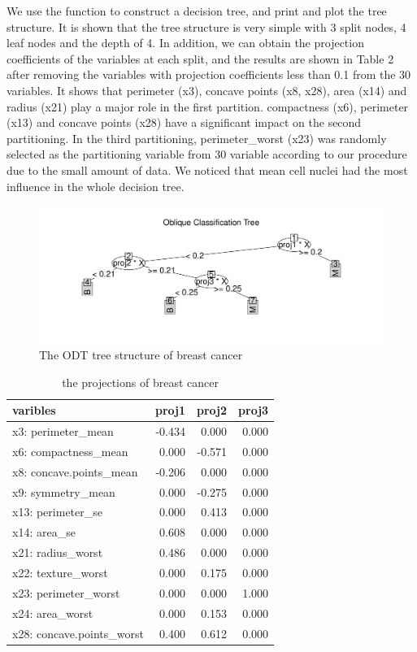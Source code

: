 \documentclass[nojss]{jss}
\newcommand{\fct}[1]{\code{#1()}}
\numberwithin{equation}{section}
\begin{document}
We use the function \fct{ODT} to construct a decision tree, and print and plot the tree structure. It is shown that the tree structure is very simple with 3 split nodes, 4 leaf nodes and the depth of 4. In addition, we can obtain the projection coefficients of the variables at each split, and the results are shown in Table 2 after removing the variables with projection coefficients less than 0.1 from the 30 variables. It shows that perimeter (x3), concave points (x8, x28), area (x14) and radius (x21) play a major role in the first partition. compactness (x6), perimeter (x13) and concave points (x28) have a significant impact on the second partitioning. In the third partitioning, perimeter\_worst (x23) was randomly selected as the partitioning variable from 30 variable according to our procedure due to the small amount of data. We noticed that mean cell nuclei had the most influence in the whole decision tree.
\begin{figure}[t!]
\centering
\includegraphics{ODRF-tree}
\caption{\label{fig:cancer.tree} The ODT tree structure of breast cancer}
\end{figure}
\begin{table}[t!]
  \centering
    \begin{tabular}{lrrr}
    \toprule
    varibles & proj1 & proj2 & proj3 \\
    \midrule
    x3: perimeter\_mean & -0.434  & 0.000  & 0.000  \\
    x6: compactness\_mean & 0.000  & -0.571  & 0.000  \\
    x8: concave.points\_mean & -0.206  & 0.000  & 0.000  \\
    x9: symmetry\_mean & 0.000  & -0.275  & 0.000  \\
    x13: perimeter\_se & 0.000  & 0.413  & 0.000  \\
    x14: area\_se & 0.608  & 0.000  & 0.000  \\
    x21: radius\_worst & 0.486  & 0.000  & 0.000  \\
    x22: texture\_worst & 0.000  & 0.175  & 0.000  \\
    x23: perimeter\_worst & 0.000  & 0.000  & 1.000  \\
    x24: area\_worst & 0.000  & 0.153  & 0.000  \\
    x28: concave.points\_worst & 0.400  & 0.612  & 0.000  \\
    \bottomrule
    \end{tabular}%
    \caption{the projections of breast cancer}\label{tab:proj}%
\end{table}%
\end{document}
